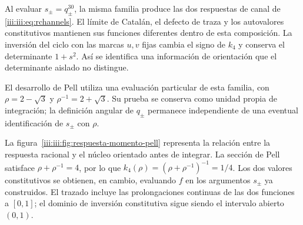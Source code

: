 Al evaluar $s_\pm=q_\pm^{30}$, la misma familia produce las dos respuestas
de canal de \eqref{iii:iii:eq:rchannels}. El límite de Catalán, el defecto de
traza y los autovalores constitutivos mantienen sus funciones diferentes
dentro de esta composición. La inversión del ciclo con las marcas $u,v$
fijas cambia el signo de $k_4$ y conserva el determinante $1+s^2$.
Así se identifica una información de orientación que el determinante
aislado no distingue.

El desarrollo de Pell utiliza una evaluación particular de esta familia,
con $\rho=2-\sqrt3$ y $\rho^{-1}=2+\sqrt3$. Su prueba se conserva como
unidad propia de integración; la definición angular de $q_\pm$ permanece
independiente de una eventual identificación de $s_\pm$ con $\rho$.

La figura~\ref{iii:iii:fig:respuesta-momento-pell} representa la relación entre
la respuesta racional y el núcleo orientado antes de integrar. La sección
de Pell satisface $\rho+\rho^{-1}=4$, por lo que
$k_4(\rho)=(\rho+\rho^{-1})^{-1}=1/4$. Los dos valores constitutivos
se obtienen, en cambio, evaluando $f$ en los argumentos $s_\pm$ ya
construidos. El trazado incluye las prolongaciones continuas de las dos
funciones a $[0,1]$; el dominio de inversión constitutiva sigue siendo
el intervalo abierto $(0,1)$.

